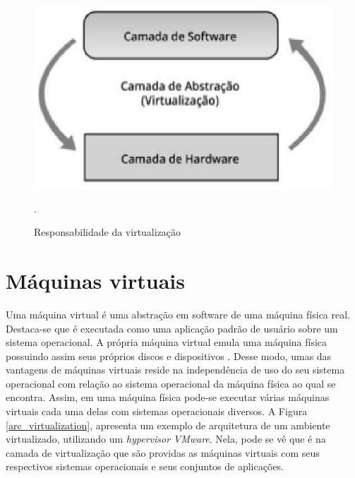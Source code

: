 \begin{figure}[!htb]
\centering
\includegraphics [keepaspectratio=true,scale=0.60]{figuras/virtualization_role.eps}
\caption{Responsabilidade da virtualização}
\cite{manoel}.
\label{virtualization_role}
\end{figure}

\section{Máquinas virtuais}
Uma máquina virtual é uma abstração em software de uma máquina física real. Destaca-se que é executada como uma aplicação padrão de usuário sobre um sistema operacional. A própria máquina virtual emula uma máquina física possuindo assim seus próprios discos e dispositivos \cite{mcewan}. Desse modo, umas das vantagens de máquinas virtuais reside na independência de uso do seu sistema operacional com relação ao sistema operacional da máquina física ao qual se encontra. Assim, em uma máquina física pode-se executar várias máquinas virtuais cada uma delas com sistemas operacionais diversos. A Figura \ref{arc_virtualization}, apresenta um exemplo de arquitetura de um ambiente virtualizado, utilizando um \textit{hypervisor} \textit{VMware}. Nela, pode se vê que é na camada de virtualização que são providas as máquinas virtuais com seus respectivos sistemas operacionais e seus conjuntos de aplicações.%

